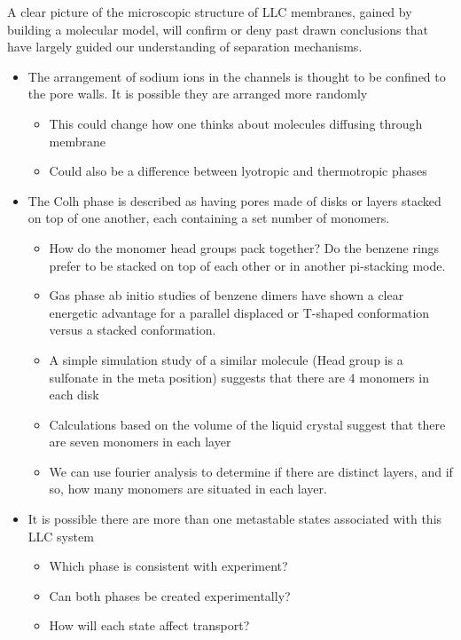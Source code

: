 \documentclass{article}
\begin{document}
\begin{itemize}
	A clear picture of the microscopic structure of LLC membranes, gained by building a molecular model, will confirm or deny past drawn conclusions that have largely guided our understanding of separation mechanisms. 
	\begin{itemize}
		\item The arrangement of sodium ions in the channels is thought to be confined to the pore walls. It is possible they are arranged more randomly
		\begin{itemize}
			\item This could change how one thinks about molecules diffusing through membrane
			\item Could also be a difference between lyotropic and thermotropic phases
		\end{itemize}
		\item The Colh phase is described as having pores made of disks or layers stacked on top of one another, each containing a set number of monomers. 
		\begin{itemize}
			\item How do the monomer head groups pack together? Do the benzene rings prefer to be stacked on top of each other or in another pi-stacking mode.
			\item Gas phase ab initio studies of benzene dimers have shown a clear energetic advantage for a parallel displaced or T-shaped conformation versus a stacked conformation. %
			\item A simple simulation study of a similar molecule (Head group is a sulfonate in the meta position) suggests that there are 4 monomers in each disk
			\item Calculations based on the volume of the liquid crystal suggest that there are seven monomers in each layer 
			\item We can use fourier analysis to determine if there are distinct layers, and if so, how many monomers are situated in each layer.
		\end{itemize}
		\item It is possible there are more than one metastable states associated with this LLC system
		\begin{itemize}
			\item Which phase is consistent with experiment?
			\item Can both phases be created experimentally?
			\item How will each state affect transport?
		\end{itemize}
	\end{itemize}
	

\end{itemize}
\end{document}
